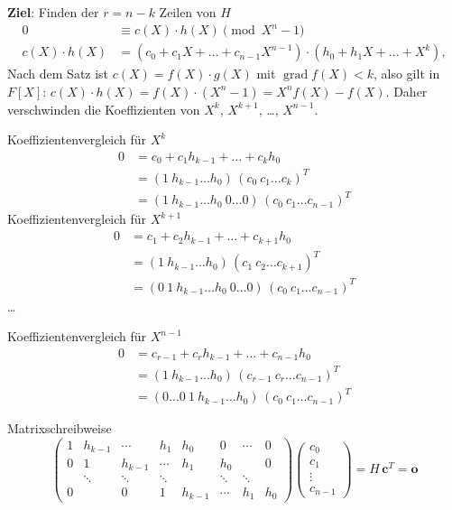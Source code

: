 \textbf{Ziel}: Finden der $r = n - k$ Zeilen von $H$
\begin{align*}
0 &\equiv c(X)\cdot h(X) \pmod{X^n - 1} \\
c(X)\cdot h(X) &= (c_0 + c_1 X + \dots + c_{n-1} X^{n-1})\cdot(h_0 + h_1 X + \dots + X^k),
\end{align*}
Nach dem Satz ist $c(X) = f(X)\cdot g(X)$ mit $\operatorname{grad} f(X) < k$, also gilt in $F[X]$: $c(X)\cdot h(X) = f(X)\cdot(X^n - 1) = X^n f(X) - f(X)$. Daher verschwinden die Koeffizienten von $X^k$, $X^{k+1}$, \dots, $X^{n-1}$.

Koeffizientenvergleich für $X^k$
\begin{align*}
0 &= c_0 + c_1 h_{k-1} + \dots + c_k h_0 \\
&= (1\ h_{k-1} \dots h_0)\,(c_0\ c_1 \dots c_k)^T \\
&= (1\ h_{k-1} \dots h_0\ 0 \dots 0)\,(c_0\ c_1 \dots c_{n-1})^T
\end{align*}
Koeffizientenvergleich für $X^{k+1}$
\begin{align*}
0 &= c_1 + c_2 h_{k-1} + \dots + c_{k+1} h_0 \\
&= (1\ h_{k-1} \dots h_0)\,(c_1\ c_2 \dots c_{k+1})^T \\
&= (0\ 1\ h_{k-1} \dots h_0\ 0 \dots 0)\,(c_0\ c_1 \dots c_{n-1})^T
\end{align*}
\dots

Koeffizientenvergleich für $X^{n-1}$
\begin{align*}
0 &= c_{r-1} + c_r h_{k-1} + \dots + c_{n-1} h_0 \\
&= (1\ h_{k-1} \dots h_0)\,(c_{r-1}\ c_r \dots c_{n-1})^T \\
&= (0 \dots 0\ 1\ h_{k-1} \dots h_0)\,(c_0\ c_1 \dots c_{n-1})^T
\end{align*}

Matrixschreibweise
\[
\begin{pmatrix}
1 & h_{k-1} & \cdots & h_1 & h_0 & 0 & \cdots & 0 \\
0 & 1 & h_{k-1} & \cdots & h_1 & h_0 & & 0 \\
 & \ddots & \ddots & \ddots & & \ddots & \ddots & \\
0 & & 0 & 1 & h_{k-1} & \cdots & h_1 & h_0
\end{pmatrix}
\begin{pmatrix}
c_0 \\ c_1 \\ \vdots \\ c_{n-1}
\end{pmatrix}
= H\, \mathbf{c}^T = \mathbf{o}
\]

